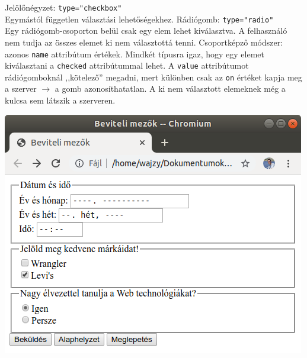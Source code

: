 \begin{frame}
  Jelölőnégyzet: \texttt{type="checkbox"}\\
  Egymástól független választási lehetőségekhez. 
  \vfill
  Rádiógomb: \texttt{type="radio"}\\
  Egy rádiógomb-csoporton belül csak egy elem lehet kiválasztva. 
  A felhasználó nem tudja az összes elemet ki nem választottá 
  tenni. Csoportképző módszer: azonos \texttt{name} attribútum 
  értékek.
  \vfill
  Mindkét típusra igaz, hogy egy elemet kiválasztani a 
  \texttt{checked} attribútummal lehet. A \texttt{value} attribútumot rádiógomboknál 
  ,,kötelező'' megadni, mert különben csak az \texttt{on} értéket 
  kapja meg a szerver $\to$ a gomb azonosíthatatlan. A ki nem 
  választott elemeknek még a kulcsa sem látszik a szerveren.
\end{frame}

\begin{frame}
  \begin{center}
    \includegraphics[width=.5\textwidth]{urlap5.png}
  \end{center}
\end{frame}

\begin{frame}
  \begin{exampleblock}{}
    \footnotesize
    
    
  \end{exampleblock}
\end{frame}

\begin{frame}
  \begin{exampleblock}{}
    \footnotesize
    
    
  \end{exampleblock}
\end{frame}

